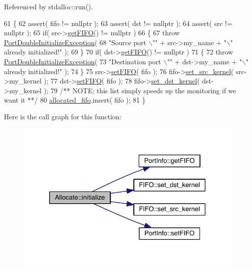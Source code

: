 Referenced by stdalloc\+::run().


\begin{DoxyCode}
61 \{
62    assert( fifo != \textcolor{keyword}{nullptr} );
63    assert( dst  != \textcolor{keyword}{nullptr} );
64    assert( src  != \textcolor{keyword}{nullptr} );
65    \textcolor{keywordflow}{if}( src->\hyperlink{struct_port_info_a483d162fbe356e07381c6c5cfccb4f48}{getFIFO}() != nullptr )
66    \{
67       \textcolor{keywordflow}{throw} \hyperlink{class_port_double_initialize_exception}{PortDoubleInitializeException}(
68          \textcolor{stringliteral}{"Source port \(\backslash\)""} + src->my\_name + \textcolor{stringliteral}{"\(\backslash\)" already initialized!"} );
69    \}
70    \textcolor{keywordflow}{if}( dst->\hyperlink{struct_port_info_a483d162fbe356e07381c6c5cfccb4f48}{getFIFO}() !=  nullptr )
71    \{
72       \textcolor{keywordflow}{throw} \hyperlink{class_port_double_initialize_exception}{PortDoubleInitializeException}(
73          \textcolor{stringliteral}{"Destination port \(\backslash\)""} + dst->my\_name +  \textcolor{stringliteral}{"\(\backslash\)" already initialized!"} );
74    \}
75    src->\hyperlink{struct_port_info_a43a57cd624dcc44ccd9dcaba1d07a000}{setFIFO}( fifo );
76    fifo->\hyperlink{class_f_i_f_o_aa9c1f679b4e2585047af2c09a2518209}{set\_src\_kernel}( src->my\_kernel );
77    dst->\hyperlink{struct_port_info_a43a57cd624dcc44ccd9dcaba1d07a000}{setFIFO}( fifo );
78    fifo->\hyperlink{class_f_i_f_o_a11422695c75c05ad2c60e662553f2667}{set\_dst\_kernel}( dst->my\_kernel );\textcolor{comment}{}
79 \textcolor{comment}{   /** NOTE: this list simply speeds up the monitoring if we want it **/}
80    \hyperlink{class_allocate_a037410210c0d10578f87de1ec68f47ba}{allocated\_fifo}.insert( fifo );
81 \}
\end{DoxyCode}
Here is the call graph for this function\+:
\nopagebreak
\begin{figure}[H]
\begin{center}
\leavevmode
\includegraphics[width=318pt]{class_allocate_a1d5c71b5cd6fc9671ed82d9c1d04965c_cgraph}
\end{center}
\end{figure}
\hypertarget{class_allocate_a44f9b51c382fec159233609e21b9d272}{}\label{class_allocate_a44f9b51c382fec159233609e21b9d272} 
